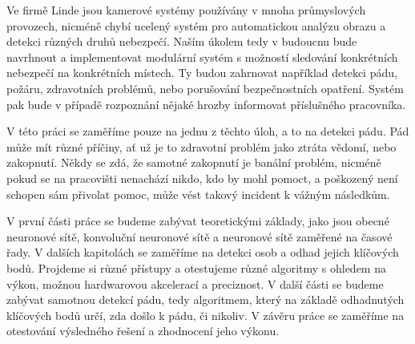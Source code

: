 Ve firmě Linde jsou kamerové systémy používány v mnoha průmyslových provozech,
nicméně chybí ucelený systém pro automatickou analýzu obrazu a detekci různých
druhů nebezpečí. Naším úkolem tedy v budoucnu bude navrhnout a implementovat
modulární systém s možností sledování konkrétních nebezpečí na konkrétních
místech. Ty budou zahrnovat například detekci pádu, požáru, zdravotních problémů,
nebo porušování bezpečnostních opatření. Systém pak bude v případě rozpoznání
nějaké hrozby informovat příslušného pracovníka.

V této práci se zaměříme pouze na jednu z těchto úloh, a to na detekci pádu.
Pád může mít různé příčiny, ať už je to zdravotní problém jako ztráta vědomí,
nebo zakopnutí. Někdy se zdá, že samotné zakopnutí je banální problém, nicméně
pokud se na pracovišti nenachází nikdo, kdo by mohl pomoct, a poškozený není
schopen sám přivolat pomoc, může vést takový incident k vážným následkům.

V první části práce se budeme zabývat teoretickými základy, jako jsou obecné
neuronové sítě, konvoluční neuronové sítě a neuronové sítě zaměřené na časové
řady. V dalších kapitolách se zaměříme na detekci osob a odhad jejich klíčových
bodů. Projdeme si různé přístupy a otestujeme různé algoritmy s ohledem na
výkon, možnou hardwarovou akcelerací a preciznost. V další části se budeme
zabývat samotnou detekcí pádu, tedy algoritmem, který na základě odhadnutých
klíčových bodů určí, zda došlo k pádu, či nikoliv. V závěru práce se zaměříme
na otestování výsledného řešení a zhodnocení jeho výkonu.

\endinput
